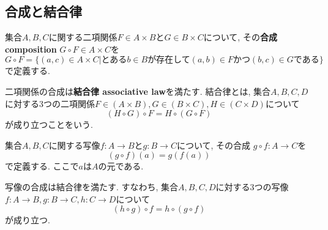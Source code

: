 \subsection{合成と結合律}
\begin{Def}
集合$A,B,C$に関する二項関係$F\in A\times B$と$G\in B\times C$について, その{\bf 合成 composition} $G\circ F\in A\times C$を
\[
G\circ F=\{(a,c)\in A\times C|\text{とある}b\in B\text{が存在して}(a,b)\in F \text{かつ} (b,c)\in G\text{である}\}
\]
で定義する.
\end{Def}
\begin{Prop}
二項関係の合成は{\bf 結合律 associative law}を満たす.
結合律とは, 集合$A,B,C,D$に対する3つの二項関係$F\in(A\times B),G\in(B\times C),H\in(C\times D)$について
\[
(H\circ G)\circ F=H\circ (G\circ F)
\]
が成り立つことをいう.
\end{Prop}

\begin{Def}
集合$A,B,C$に関する写像$f:A\rightarrow B$と$g:B\rightarrow C$について, その合成 $g\circ f:A\rightarrow C$を
\[
(g\circ f)(a)=g(f(a))
\]
で定義する. ここで$a$は$A$の元である.
\end{Def}
\begin{Prop}
写像の合成は結合律を満たす.
すなわち, 集合$A,B,C,D$に対する3つの写像$f:A\rightarrow B, g:B\rightarrow C,
h:C\rightarrow D$について
\[
(h\circ g)\circ f=h\circ(g\circ f)
\]
が成り立つ.
\end{Prop}